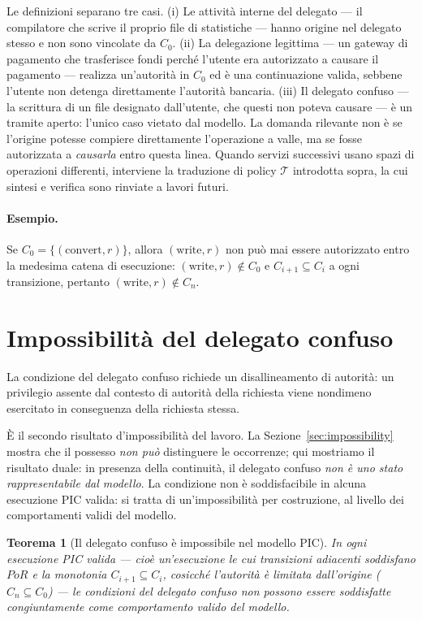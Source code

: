 \documentclass[11pt]{article}
\newtheorem{theorem}{Teorema}
\begin{document}
Le definizioni separano tre casi. (i) Le attività interne del delegato --- il
compilatore che scrive il proprio file di statistiche --- hanno origine nel
delegato stesso e non sono vincolate da $C_0$. (ii) La delegazione legittima ---
un gateway di pagamento che trasferisce fondi perché l'utente era autorizzato a
causare il pagamento --- realizza un'autorità in $C_0$ ed è una continuazione
valida, sebbene l'utente non detenga direttamente l'autorità bancaria. (iii) Il
delegato confuso --- la scrittura di un file designato dall'utente, che questi
non poteva causare --- è un tramite aperto: l'unico caso vietato dal modello. La
domanda rilevante non è se l'origine potesse compiere direttamente l'operazione
a valle, ma se fosse autorizzata a \emph{causarla} entro questa linea. Quando
servizi successivi usano spazi di operazioni differenti, interviene la
traduzione di policy $\mathcal{T}$ introdotta sopra, la cui sintesi e verifica
sono rinviate a lavori futuri.

\paragraph{Esempio.}
Se $C_0 = \{(\text{convert},r)\}$, allora $(\text{write},r)$ non può mai essere
autorizzato entro la medesima catena di esecuzione:
$(\text{write},r)\notin C_0$ e $C_{i+1}\subseteq C_i$ a ogni transizione,
pertanto $(\text{write},r)\notin C_n$.

\section{Impossibilità del delegato confuso}
\label{sec:cdimposs}

La condizione del delegato confuso richiede un disallineamento di autorità: un
privilegio assente dal contesto di autorità della richiesta viene nondimeno
esercitato in conseguenza della richiesta stessa.

È il secondo risultato d'impossibilità del lavoro. La
Sezione~\ref{sec:impossibility} mostra che il possesso \emph{non può} distinguere
le occorrenze; qui mostriamo il risultato duale: in presenza della continuità,
il delegato confuso \emph{non è uno stato rappresentabile dal modello}. La
condizione non è soddisfacibile in alcuna esecuzione PIC valida: si tratta di
un'impossibilità per costruzione, al livello dei comportamenti validi del
modello.

\begin{theorem}[Il delegato confuso è impossibile nel modello PIC]
In ogni esecuzione PIC valida --- cioè un'esecuzione le cui transizioni
adiacenti soddisfano $PoR$ e la monotonia $C_{i+1}\subseteq C_i$, cosicché
l'autorità è limitata dall'origine ($C_n \subseteq C_0$) --- le condizioni del
delegato confuso non possono essere soddisfatte congiuntamente come
comportamento valido del modello.
\end{theorem}
\end{document}
